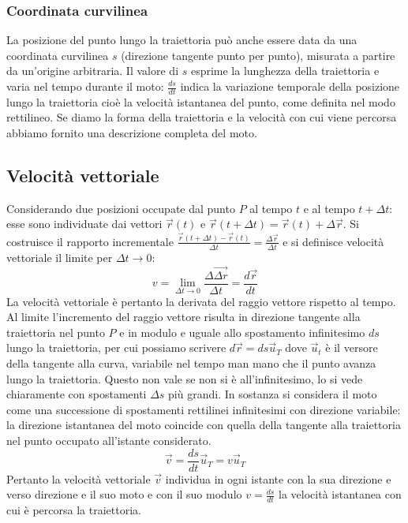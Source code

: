 \documentclass[class=book, crop=false, oneside, 12pt]{standalone}
\begin{document}
    \subsubsection{Coordinata curvilinea}
    La posizione del punto lungo la traiettoria può anche essere data da una coordinata curvilinea \(s\) (direzione tangente punto per punto), misurata a partire da un'origine arbitraria.
    Il valore di \(s\) esprime la lunghezza della traiettoria e varia nel tempo durante il moto: \(\frac{ds}{dt}\) indica la variazione temporale della posizione lungo la traiettoria cioè la velocità istantanea del punto, come definita nel modo rettilineo.
    Se diamo la forma della traiettoria e la velocità con cui viene percorsa abbiamo fornito una descrizione completa del moto.
  \subsection{Velocit\`a vettoriale}
  Considerando due posizioni occupate dal punto \(P\) al tempo \(t\) e al tempo \(t + \Delta t\): esse sono individuate dai vettori \(\overrightarrow{r}(t)\) e \(\overrightarrow{r}(t + \Delta t) = \overrightarrow{r}(t) + \Delta \overrightarrow{r}\).
  Si costruisce il rapporto incrementale \(\frac{\overrightarrow{r}(t+\Delta t) - \overrightarrow{r}(t)}{\Delta t} = \frac{\Delta \overrightarrow{r}}{\Delta t}\) e si definisce velocità vettoriale il limite per \(\Delta t \rightarrow 0\):
  \begin{equation}
    v = \lim\limits_{\Delta t \rightarrow 0} \dfrac{\Delta\overrightarrow{\Delta r}}{\Delta t}= \dfrac{d \overrightarrow{r}}{dt}
  \end{equation}
  La velocità vettoriale è pertanto la derivata del raggio vettore rispetto al tempo.
  Al limite l'incremento del raggio vettore risulta in direzione tangente alla traiettoria nel punto \(P\) e in modulo e uguale allo spostamento infinitesimo \(ds\) lungo la traiettoria,
  per cui possiamo scrivere \(d \overrightarrow{r} = ds \overrightarrow{u}_T\) dove \(\overrightarrow{u}_t\) è il versore della tangente alla curva, variabile nel tempo man mano che il punto avanza lungo la traiettoria.
  Questo non vale se non si è all'infinitesimo, lo si vede chiaramente con spostamenti \(\Delta s\) più grandi.
  In sostanza si considera il moto come una successione di spostamenti rettilinei infinitesimi con direzione variabile: la direzione istantanea del moto coincide con quella della tangente alla traiettoria nel punto occupato all'istante considerato.
  \begin{equation}
    \overrightarrow{v} = \frac{ds}{dt} \overrightarrow{u}_T = v \overrightarrow{u}_T
  \end{equation}
  Pertanto la velocità vettoriale \(\overrightarrow{v}\) individua in ogni istante con la sua direzione e verso direzione e il suo moto e con il suo modulo \(v = \frac{ds}{dt}\) la velocità istantanea con cui è percorsa la traiettoria.
\end{document}
